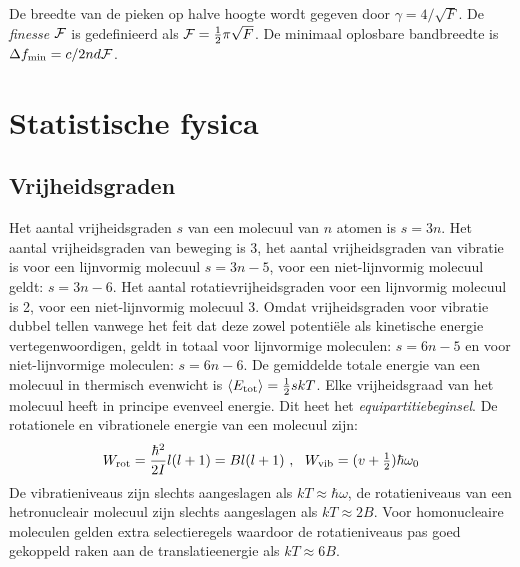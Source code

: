 \documentclass[twoside]{report}
\begin{document}
\npar
De breedte van de pieken op halve hoogte wordt gegeven door
$\gamma=4/\sqrt{F}$. De {\it finesse} $\cal F$ is gedefinieerd als ${\cal
F}=\mbox{$\frac{1}{2}$}\pi\sqrt{F}$. De minimaal oplosbare bandbreedte is $\Delta f_{\rm
min}=c/2nd{\cal F}$.

\chapter{Statistische fysica}
\section{Vrijheidsgraden}
Het aantal vrijheidsgraden $s$ van een molecuul van $n$ atomen is $s=3n$.
Het aantal vrijheidsgraden van beweging is 3, het aantal vrijheidsgraden van
vibratie is voor een lijnvormig molecuul $s=3n-5$, voor een niet-lijnvormig
molecuul geldt: $s=3n-6$. Het aantal rotatievrijheidsgraden voor een
lijnvormig molecuul is 2, voor een niet-lijnvormig molecuul 3.
\npar
Omdat vrijheidsgraden voor vibratie dubbel tellen vanwege het feit dat deze
zowel potenti\"ele als kinetische energie vertegenwoordigen, geldt in totaal
voor lijnvormige moleculen: $s=6n-5$ en voor niet-lijnvormige moleculen:
$s=6n-6$. De gemiddelde totale energie van een molecuul in thermisch evenwicht
is $\left\langle E_{\rm tot} \right\rangle=\frac{1}{2}skT$. Elke vrijheidsgraad van het molecuul
heeft in principe evenveel energie. Dit heet het {\it equipartitiebeginsel}.
\npar
De rotationele en vibrationele energie van een molecuul zijn:
\[
W_{\rm rot}=\frac{\hbar^2}{2I}l(l+1)=Bl(l+1)~,~~W_{\rm vib}=(v+\mbox{$\frac{1}{2}$})\hbar\omega_0
\]
De vibratieniveaus zijn slechts aangeslagen als $kT\approx\hbar\omega$, de
rotatieniveaus van een hetronucleair molecuul zijn slechts aangeslagen als
$kT\approx2B$. Voor homonucleaire moleculen gelden extra selectieregels
waardoor de rotatieniveaus pas goed gekoppeld raken aan de translatieenergie
als $kT\approx6B$.
\end{document}
